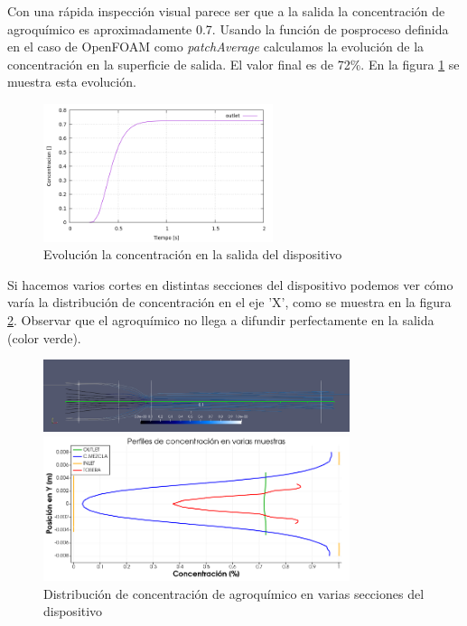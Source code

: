 \documentclass[oneside,a4paper,spanish,links]{amca}
\begin{document}
Con una rápida inspección visual parece ser que a la salida la concentración de agroquímico es aproximadamente 0.7. Usando la función de posproceso definida en el caso de OpenFOAM como \textit{patchAverage} calculamos la evolución de la concentración en la superficie de salida. El valor final es de 72\%. En la figura \ref{fg:05_avg_T} se muestra esta evolución.


\begin{figure}[htb]
	\centerline{
		\includegraphics[width=0.6\textwidth]{Figuras/05_AVERAGE_T.png}
	}
	\caption{Evolución la concentración en la salida del dispositivo} \label{fg:05_avg_T}
\end{figure}

Si hacemos varios cortes en distintas secciones del dispositivo podemos ver cómo varía la distribución de concentración en el eje 'X', como se muestra en la figura \ref{fg:05_STR_XY}. Observar que el agroquímico no llega a difundir perfectamente en la salida (color verde).


\begin{figure}[htb]
	\centerline{
		\includegraphics[width=0.8\textwidth]{Figuras/05_STREAM_DIVISIONES.png}
	}
	\centerline{
		\includegraphics[width=0.8\textwidth]{Figuras/05_T_VARIAS.png}
	}
	\caption{Distribución de concentración de agroquímico en varias secciones del dispositivo} \label{fg:05_STR_XY}
\end{figure}
\end{document}

